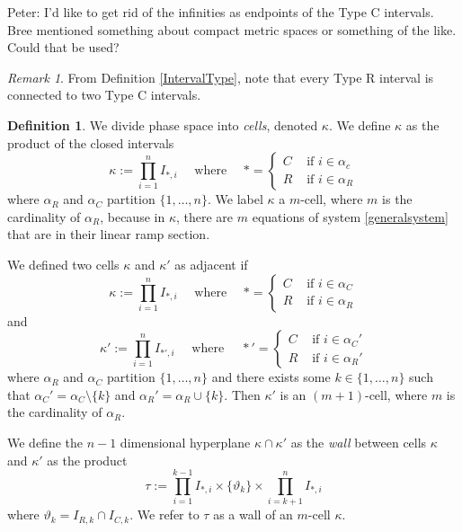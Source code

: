 \documentclass[12pt]{article}
\theoremstyle{definition}
\newtheorem{defn}{Definition}[section]
\theoremstyle{remark}
\newtheorem*{remark}{Remark}
\begin{document}
{\color{cyan} Peter: I'd like to get rid of the infinities as endpoints of the Type C intervals. Bree mentioned something about compact metric spaces or something of the like. Could that be used?}

\begin{remark}
From Definition \ref{IntervalType}, note that every Type R interval is connected to two Type C intervals.
\end{remark}

\begin{defn} \label{kappa}
 We divide phase space into \textit{cells}, denoted $\kappa$. We define $\kappa$ as the product of the closed intervals
 \begin{equation}	\label{kappadefn}
 \kappa:=\prod_{i=1}^n I_{*,i} \quad \text{ where } \quad *=
 \begin{cases} 
 C & \text { if } i\in\alpha_c \\
 R & \text{ if } i \in \alpha_R
 \end{cases}
 \end{equation}
 where $\alpha_R$ and $\alpha_C$ partition $\{1,\dots,n\}$. We label $\kappa$ a  $m$-cell, where $m$ is the cardinality of $\alpha_R$, because in $\kappa$, there are $m$ equations of system \eqref{generalsystem} that are in their linear ramp section.

We defined two cells $\kappa$ and $\kappa'$ as adjacent if 
\begin{equation*}
\kappa:=\prod_{i=1}^n I_{*,i} \quad \text{ where } \quad *=
 \begin{cases} 
 C & \text { if } i\in\alpha_C \\
 R & \text{ if } i \in \alpha_R
 \end{cases}
 \end{equation*}
 and 
 \begin{equation*}
\kappa':=\prod_{i=1}^n I_{*',i} \quad \text{ where } \quad *'=
 \begin{cases} 
 C & \text { if } i\in\alpha_C' \\
 R & \text{ if } i \in \alpha_R'
 \end{cases}
 \end{equation*}
 where $\alpha_R$ and $\alpha_C$ partition $\{1,\dots,n\}$ and there exists some $k\in \{1,\dots,n\}$ such that $\alpha_C'=\alpha_C\setminus \{k\}$ and $\alpha_R'=\alpha_R\cup \{k\}$. Then $\kappa'$ is an $(m+1)$-cell, where $m$ is the cardinality of $\alpha_R$.
 
We define the $n-1$ dimensional hyperplane $\kappa \cap \kappa'$ as the \textit{wall} between cells $\kappa$ and $\kappa'$ as the product
\begin{equation*}
\tau:=\prod_{i=1}^{k-1} I_{*,i} \times \{\vartheta_k\} \times \prod_{i=k+1}^{n} I_{*,i}
\end{equation*}
where $\vartheta_k = I_{R,k} \cap I_{C,k}$. We refer to $\tau$ as a wall of an $m$-cell $\kappa$.
\end{defn}
\end{document}
